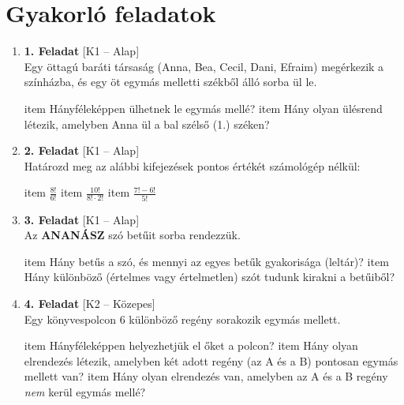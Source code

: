 \documentclass[12pt,a4paper]{article}
\begin{document}
\newpage

\section*{Gyakorló feladatok}

\begin{enumerate}[label=\arabic*., leftmargin=*]
    
    \item \textbf{1. Feladat} \textsf{\small [K1 – Alap]} \\
    Egy öttagú baráti társaság (Anna, Bea, Cecil, Dani, Efraim) megérkezik a színházba, és egy öt egymás melletti székből álló sorba ül le.
    \begin{enumerate}[label=\alph*)]
        item Hányféleképpen ülhetnek le egymás mellé?
        item Hány olyan ülésrend létezik, amelyben Anna ül a bal szélső (1.) széken?
    \end{enumerate}

    \vspace{0.4cm}

    \item \textbf{2. Feladat} \textsf{\small [K1 – Alap]} \\
    Határozd meg az alábbi kifejezések pontos értékét számológép nélkül:
    \begin{enumerate}[label=\alph*)]
        item $\frac{8!}{6!}$
        item $\frac{10!}{8! \cdot 2!}$
        item $\frac{7! - 6!}{5!}$
    \end{enumerate}

    \vspace{0.4cm}

    \item \textbf{3. Feladat} \textsf{\small [K1 – Alap]} \\
    Az \textbf{ANANÁSZ} szó betűit sorba rendezzük. 
    \begin{enumerate}[label=\alph*)]
        item Hány betűs a szó, és mennyi az egyes betűk gyakorisága (leltár)?
        item Hány különböző (értelmes vagy értelmetlen) szót tudunk kirakni a betűiből?
    \end{enumerate}

    \vspace{0.4cm}

    \item \textbf{4. Feladat} \textsf{\small [K2 – Közepes]} \\
    Egy könyvespolcon 6 különböző regény sorakozik egymás mellett.
    \begin{enumerate}[label=\alph*)]
        item Hányféleképpen helyezhetjük el őket a polcon?
        item Hány olyan elrendezés létezik, amelyben két adott regény (az A és a B) pontosan egymás mellett van?
        item Hány olyan elrendezés van, amelyben az A és a B regény \emph{nem} kerül egymás mellé?
    \end{enumerate}


\end{enumerate}
\end{document}
